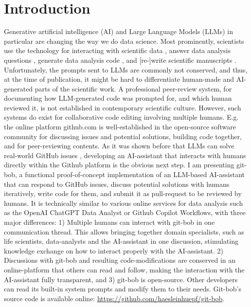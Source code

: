 \documentclass[times, twoside]{zHenriquesLab-StyleBioRxiv}
\begin{document}
\section*{Introduction}

Generative artificial intelligence (AI) and Large Language Models (LLMs) in particular are changing the way we do data science. Most prominently, scientists use the technology for interacting with scientific data \cite{Royer2023}, answer data analysis questions \cite{Lai2022DS1000, lei2024bioimage}, generate data analysis code \cite{Royer2024, benchmark_llm_bia, chen2021evaluating}, and [re-]write scientific manuscripts \cite{lu2024aiscientist}. Unfortunately, the prompts sent to LLMs are commonly not conserved, and thus, at the time of publication, it might be hard to differentiate human-made and AI-generated parts of the scientific work. A professional peer-review system, for documenting how LLM-generated code was prompted for, and which human reviewed it, is not established in contemporary scientific culture. However, such systems do exist for collaborative code editing involving multiple humans. E.g. the online platform github.com is well-established in the open-source software community for discussing issues and potential solutions, building code together, and for peer-reviewing contents. As it was shown before that LLMs can solve real-world GitHub issues \cite{jimenez2024swebenchlanguagemodelsresolve}, developing an AI-assistant that interacts with humans directly within the Github platform is the obvious next step. I am presenting git-bob, a functional proof-of-concept implementation of an LLM-based AI-assistant that can respond to GitHub issues, discuss potential solutions with humans iteratively, write code for them, and submit it as pull-request to be reviewed by humans. It is technically similar to various online services for data analysis such as the OpenAI ChatGPT Data Analyst or Github Copilot Workflows, with three major differences: 1) Multiple humans can interact with git-bob in one communication thread. This allows bringing together domain specialists, such as life scientists, data-analysts and the AI-assistant in one discussion, stimulating knowledge exchange on how to interact properly with the AI-assistant. 2) Discussions with git-bob and resulting code-modifications are conserved in an online-platform that others can read and follow, making the interaction with the AI-assistant fully transparent, and 3) git-bob is open-source. Other developers can read its built-in system prompts and modify them to their needs.  Git-bob's source code is available online: \url{https://github.com/haesleinhuepf/git-bob}.
\end{document}
